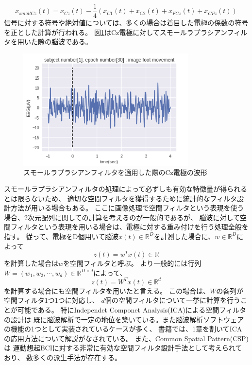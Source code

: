 \begin{equation}
    x_{smallCz}(t) = x_{Cz}(t) - \frac{1}{4}(x_{C1}(t) + x_{C2}(t) + x_{FCz}(t) + x_{CPz}(t))
\end{equation}
信号に対する符号や絶対値については、多くの場合は着目した電極の係数の符号を正とした計算が行われる。
図\ref{fig:Cz}はCz電極に対してスモールラプラシアンフィルタを用いた際の脳波である。
\begin{figure}[t]
    \centering
    \includegraphics[width=9cm]{images/rapCzEEG.png}
    \caption{スモールラプラシアンフィルタを適用した際のCz電極の波形}
    \label{fig:Cz}
\end{figure}
スモールラプラシアンフィルタの処理によって必ずしも有効な特徴量が得られるとは限らないため、
適切な空間フィルタを獲得するために統計的なフィルタ設計方法が用いる場合もある。
ここに画像処理で空間フィルタという表現を使う場合、2次元配列に関しての計算を考えるのが一般的であるが、
脳波に対して空間フィルタという表現を用いる場合は、電極に対する重み付けを行う処理全般を指す。
従って、電極をD個用いて脳波\(x(t) \in \mathbb R^D\)を計測した場合に、\(w \in \mathbb R^D\)によって
\begin{equation}
    z(t) = w^T x(t) \in \mathbb R
\end{equation}
を計算した場合は\(w\)を空間フィルタと呼ぶ。
より一般的には行列\(W = (w_1, w_2, \cdots, w_d) \in \mathbb R^{D \times d}\)によって、
\begin{equation}
    z(t) = W^T x(t) \in \mathbb R^d
\end{equation}
を計算する場合にも空間フィルタを用いたと言える。
この場合は、\(W\)の各列が空間フィルタ1つ1つに対応し、
\(d\)個の空間フィルタについて一挙に計算を行うことが可能である。
特にIndependet Componet Analysis(ICA)による空間フィルタの設計は
既に脳波解析で一定の地位を築いている。また脳波解析ソフトウェアの機能の1つとして実装されているケースが多く、
書籍\cite{脳波解析入門}では、1章を割いてICAの応用方法について解説がなされている。
また、Common Spatial Pattern(CSP)は
運動想起BCIに対する非常に有効な空間フィルタ設計手法として考えられており、
数多くの派生手法が存在する\cite{CSP1990}\cite{CSP1999}\cite{cvscsp}\cite{fbcsp}\cite{csssp}\cite{csp_eigen}。

